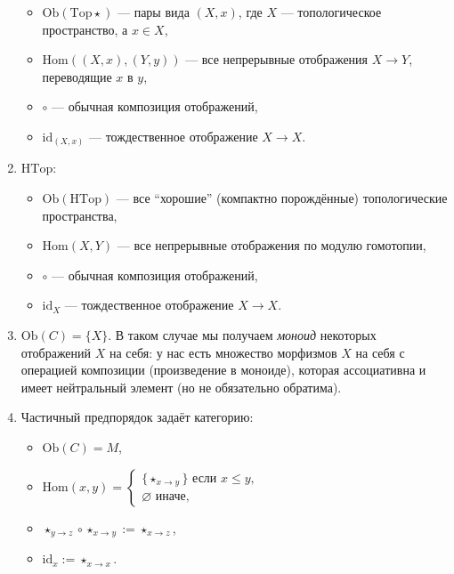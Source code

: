 \documentclass[12pt,a4paper]{article}
\newcommand{\Hom}{\mathrm{Hom}}
\newcommand{\Ob}{\mathrm{Ob}}
\newcommand{\id}{\mathrm{id}}
\newcommand{\Topstar}{\mathrm{Top\star}}
\newcommand{\HTop}{\mathrm{HTop}}
\begin{document}
\begin{example}
\begin{enumerate}
\begin{itemize}
                    \item $\Ob(\Topstar)$ --- пары вида $(X, x)$, где $X$ --- топологическое пространство, а $x \in X$,
                    \item $\Hom((X, x), (Y, y))$ --- все непрерывные отображения $X \to Y$, переводящие $x$ в $y$,
                    \item $\circ$ --- обычная композиция отображений,
                    \item $\id_{(X, x)}$ --- тождественное отображение $X \to X$.
                \end{itemize}
            \item $\HTop$:
                \begin{itemize}
                    \item $\Ob(\HTop)$ --- все ``хорошие'' (компактно порождённые) топологические пространства,
                    \item $\Hom(X, Y)$ --- все непрерывные отображения по модулю гомотопии,
                    \item $\circ$ --- обычная композиция отображений,
                    \item $\id_X$ --- тождественное отображение $X \to X$.
                \end{itemize}
            \item $\Ob(C) = \{X\}$. В таком случае мы получаем \emph{моноид} некоторых отображений $X$ на себя: у нас есть множество морфизмов $X$ на себя с операцией композиции (произведение в моноиде), которая ассоциативна и имеет нейтральный элемент (но не обязательно обратима).
            \item Частичный предпорядок задаёт категорию:
                \begin{itemize}
                    \item $\Ob(C) = M$,
                    \item
                        $\Hom(x, y) = \begin{cases}
                            \{\star_{x\to y}\} \text{ если } x \leqslant y,\\
                            \varnothing \text{ иначе},
                        \end{cases}$
                    \item $\star_{y\to z} \circ \star_{x\to y} := \star_{x\to z}$,
                    \item $\id_x := \star_{x\to x}$.
                \end{itemize}

\end{enumerate}
\end{example}
\end{document}
